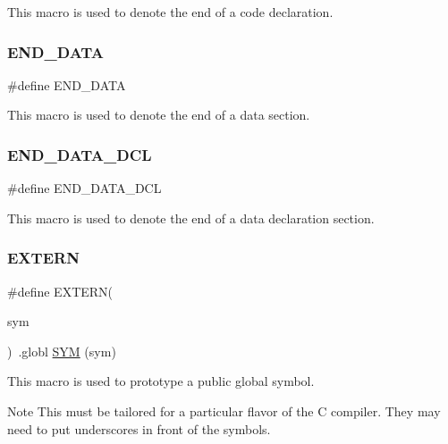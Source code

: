 This macro is used to denote the end of a code declaration. \mbox{\label{group__RTEMSScoreCPUExampleASM_gab989978585b78e98ff314e8abb5f9bb0}} 
\subsubsection{\texorpdfstring{END\_DATA}{END\_DATA}}
{\footnotesize\ttfamily \#define E\+N\+D\+\_\+\+D\+A\+TA}

This macro is used to denote the end of a data section. \mbox{\label{group__RTEMSScoreCPUExampleASM_gaba5951c6a7df52e7c13d07a6823e9758}} 
\subsubsection{\texorpdfstring{END\_DATA\_DCL}{END\_DATA\_DCL}}
{\footnotesize\ttfamily \#define E\+N\+D\+\_\+\+D\+A\+T\+A\+\_\+\+D\+CL}

This macro is used to denote the end of a data declaration section. \mbox{\label{group__RTEMSScoreCPUExampleASM_ga9808b867f8d1bd54d78548a5cd5dc415}} 
\subsubsection{\texorpdfstring{EXTERN}{EXTERN}}
{\footnotesize\ttfamily \#define E\+X\+T\+E\+RN(\begin{DoxyParamCaption}\item[{}]{sym }\end{DoxyParamCaption})~.globl \mbox{\hyperlink{group__RTEMSScoreCPUx86-64ASM_gafe05d428a5f345f51fb591debb815325}{S\+YM}} (sym)}

This macro is used to prototype a public global symbol.

\begin{DoxyNote}{Note}
This must be tailored for a particular flavor of the C compiler. They may need to put underscores in front of the symbols. 
\end{DoxyNote}
\mbox{\label{group__RTEMSScoreCPUExampleASM_ga5e536c0e80cb78da6a74541281111e40}} 
